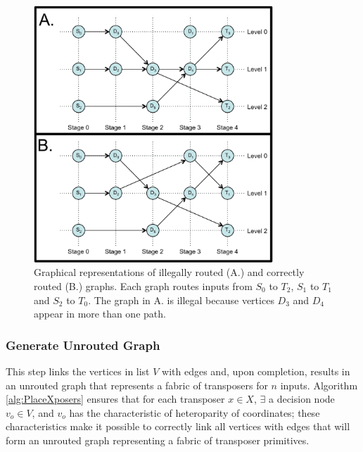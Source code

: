 \begin{figure}[h]
     \begin{minipage}[t]{0.99\linewidth}\centering
      \includegraphics[width=9cm]{fig6.pdf}
      \medskip
     \end{minipage}\hfill
     \caption[Graphical representations of an illegally routed versus a correctly routed graph]{Graphical representations of illegally routed (A.) and correctly routed (B.) graphs. Each graph routes inputs from $S_0$ to $T_2$, $S_1$ to $T_1$ and $S_2$ to $T_0$. The graph in A. is illegal because vertices $D_3$  and $D_4$ appear in more than one path.}
    \label{fig:legalese}
\end{figure}


\subsubsection{Generate Unrouted Graph}
This step links the vertices in list $V$ with edges and, upon completion, results in an unrouted graph that represents a fabric of transposers for $n$ inputs. Algorithm \ref{alg:PlaceXposers} ensures that for each transposer $x\in X$, $\exists$ a decision node $v_o\in V$, and $v_o$ has the characteristic of heteroparity of coordinates; these characteristics make it possible to correctly link all vertices with edges that will form an unrouted graph representing a fabric of transposer primitives. 
    
